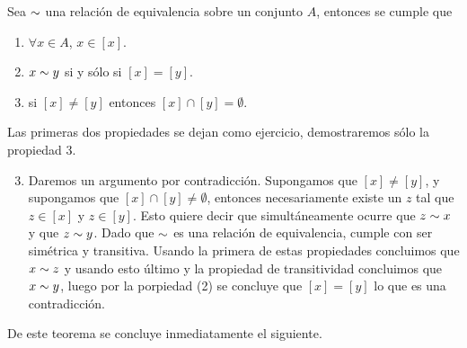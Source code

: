 \begin{teorema}
\label{teo:equiv-rel}
Sea $\sim$ una relación de equivalencia sobre un conjunto $A$, entonces se cumple que
\begin{enumerate}
  \itemsep 0pt
  \item $\forall x\in A$, $x\in[x]$.
  \item $x\sim y$ si y sólo si $[x]=[y]$.
  \item si $[x]\not=[y]$ entonces $[x]\cap[y]=\emptyset$.
\end{enumerate}
\begin{demostracion}
Las primeras dos propiedades se dejan como ejercicio, demostraremos sólo la propiedad 3.
\begin{enumerate}
  \setcounter{enumi}{2}
  \item Daremos un argumento por contradicción.
  Supongamos que $[x]\not=[y]$, y supongamos que $[x]\cap[y]\not=\emptyset$, entonces necesariamente existe un $z$ tal que $z\in[x]$ y $z\in[y]$.
  Esto quiere decir que simultáneamente ocurre que $z\sim x$ y que $z\sim y$.
  Dado que $\sim$ es una relación de equivalencia, cumple con ser simétrica y transitiva.
  Usando la primera de estas propiedades concluimos que $x\sim z$ y usando esto último y la propiedad de transitividad concluimos que $x\sim y$, luego por la porpiedad (2) se concluye que $[x]=[y]$ lo que es una contradicción.
\end{enumerate}
\end{demostracion}

De este teorema se concluye inmediatamente el siguiente.
\end{teorema}

